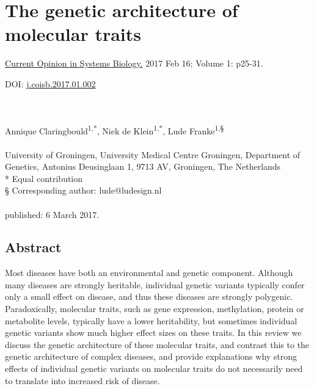 \chapter[This is an example chapter]{The genetic architecture of molecular traits}
\label{chap:chapter1}

\hfill \underline{Current Opinion in Systems Biology.} 2017 Feb 16; Volume 1: p25-31.

\hfill DOI: \href{https://doi.org/10.1016/j.coisb.2017.01.002}{j.coisb.2017.01.002}


\noindent
\\
\\
Annique Claringbould\textsuperscript{1,*}, Niek de Klein\textsuperscript{1,*}, Lude Franke\textsuperscript{1,§}
\\
\\
 University of Groningen, University Medical Centre Groningen, Department of Genetics, Antonius Deusinglaan 1, 9713 AV, Groningen, The Netherlands\\
* Equal contribution\\
§ Corresponding author: lude@ludesign.nl
\\
\\
\noindent
published: 6 March 2017.



\section*{Abstract}

Most diseases have both an environmental and genetic component. Although many diseases are strongly heritable, individual genetic variants typically confer only a small effect on disease, and thus these diseases are strongly polygenic. Paradoxically, molecular traits, such as gene expression, methylation, protein or metabolite levels, typically have a lower heritability, but sometimes individual genetic variants show much higher effect sizes on these traits. In this review we discuss the genetic architecture of these molecular traits, and contrast this to the genetic architecture of complex diseases, and provide explanations why strong effects of individual genetic variants on molecular traits do not necessarily need to translate into increased risk of disease.

